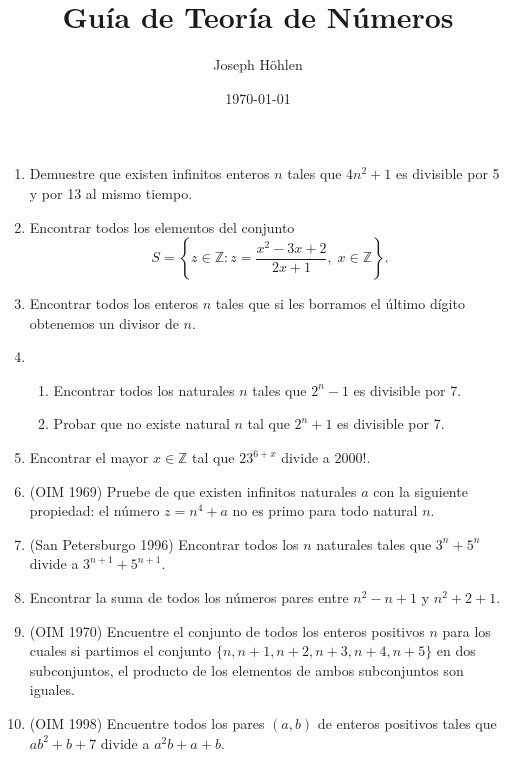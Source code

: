 \documentclass[letterpaper,11pt]{article}
\title{Guía de Teoría de Números}
\author{Joseph Höhlen}
\date\today
\newcommand{\Z}{\mathbb{Z}}
\begin{document}
\maketitle

\begin{enumerate}
\item Demuestre que existen infinitos enteros $n$ tales que $4n^2+1$ es divisible por 5 y por 13 al mismo tiempo.
\item Encontrar todos los elementos del conjunto
$$S=\left\{z\in\Z:z=\frac{x^2-3x+2}{2x+1},\; x\in\Z\right\}.$$
\item Encontrar todos los enteros $n$ tales que si les borramos el último dígito obtenemos un divisor de $n$.
\item
	\begin{enumerate}
	\item Encontrar todos los naturales $n$ tales que $2^n-1$ es divisible por 7.
	\item Probar que no existe natural $n$ tal que $2^n+1$ es divisible por 7.
	\end{enumerate}
\item Encontrar el mayor $x\in\Z$ tal que $23^{6+x}$ divide a $2000!$.
\item (OIM 1969) Pruebe de que existen infinitos naturales $a$ con la siguiente propiedad: el número $z=n^4+a$ no es primo para todo natural $n$.
\item (San Petersburgo 1996) Encontrar todos los $n$ naturales tales que $3^n+5^n$ divide a $3^{n+1}+5^{n+1}$.
\item Encontrar la suma de todos los números pares entre $n^2-n+1$ y $n^2+2+1$.
\item (OIM 1970) Encuentre el conjunto de todos los enteros positivos $n$ para los cuales si partimos el conjunto $\{n,n+1,n+2,n+3,n+4,n+5\}$ en dos subconjuntos, el producto de los elementos de ambos subconjuntos son iguales.
\item (OIM 1998) Encuentre todos los pares $(a,b)$ de enteros positivos tales que $ab^2+b+7$ divide a $a^2b+a+b$.
\end{enumerate}

\nocite{*}
\printbibliography
\end{document}
